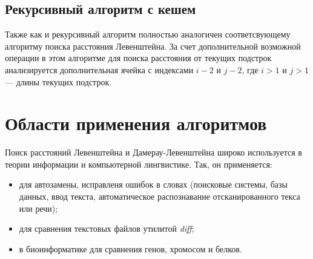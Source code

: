 \subsection{Рекурсивный алгоритм с кешем}

Также как и рекурсивный алгоритм полностью аналогичен соответсвующему алгоритму
поиска расстояния Левенштейна. За счет дополнительной возможной операции
в этом алгоритме для поиска расстояния от текущих подстрок анализируется 
дополнительная ячейка с индексами $i - 2$ и $j - 2$, где $i > 1$ и $j > 1$ ---
длины текущих подстрок.

\section{Области применения алгоритмов}

Поиск расстояний Левенштейна и Дамерау-Левенштейна широко используется в теории
информации и компьютерной лингвистике. Так, он применяется:
\begin{itemize}
    \item для автозамены, исправленя ошибок в словах (поисковые системы, базы
          данных, ввод текста, автоматическое распознавание отсканированного
          текса или речи);
    \item для сравнения текстовых файлов утилитой \textit{diff};
    \item в биоинформатике для сравнения генов, хромосом и белков.
\end{itemize}
